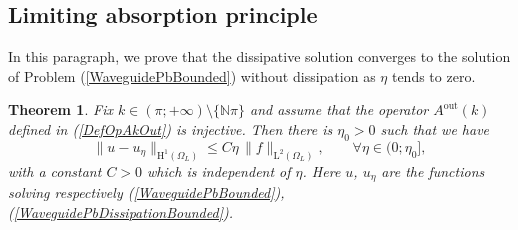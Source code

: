 \documentclass[11pt,a4paper]{report}
\newcommand{\Om}{\Omega}
\newcommand{\mrm}[1]{\mathrm{#1}}
\newcommand{\N}{\mathbb{N}}
\newcommand{\mL}{\mrm{L}}
\newcommand{\mH}{\mrm{H}}
\newtheorem{theorem}{Theorem}[chapter]
\begin{document}
\subsection{Limiting absorption principle}\label{ParaLimitingAbs}

In this paragraph, we prove that the dissipative solution converges to the solution of Problem (\ref{WaveguidePbBounded}) without dissipation as $\eta$ tends to zero.


\begin{theorem}
Fix $k\in(\pi;+\infty)\setminus\{\N\pi\}$ and assume that the operator $A^{\mrm{out}}(k)$ defined in (\ref{DefOpAkOut}) is injective. Then there is $\eta_0>0$ such that we have
\[
\|u-u_\eta\|_{\mH^1(\Om_L)} \le C\eta\,\|f\|_{\mL^2(\Om_L)},\qquad \forall \eta\in(0;\eta_0],
\]
with a constant $C>0$ which is independent of $\eta$. Here $u$, $u_\eta$ are the functions solving respectively (\ref{WaveguidePbBounded}), (\ref{WaveguidePbDissipationBounded}).
\end{theorem}
\end{document}
